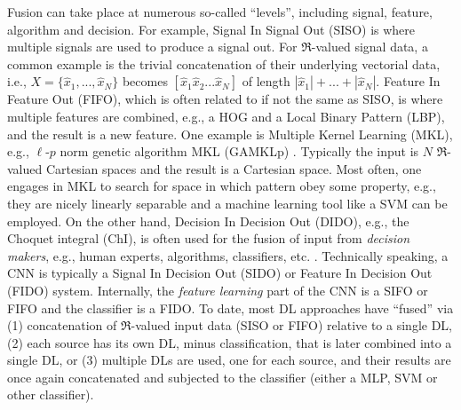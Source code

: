 \documentclass[12pt]{spieman}
\begin{document}
\begin{spacing}{1}
Fusion can take place at numerous so-called ``levels'', including signal, feature, algorithm and decision. For example, Signal In Signal Out (SISO) is where multiple signals are used to produce a signal out. For $\Re$-valued signal data, a common example is the trivial concatenation of their underlying vectorial data, i.e., $X=\{ \hat{x}_1, ... , \hat{x}_N \}$ becomes $[ \hat{x}_1 \hat{x}_2 ... \hat{x}_N ]$ of length $|\hat{x}_1|+...+|\hat{x}_N|$. Feature In Feature Out (FIFO), which is often related to if not the same as SISO, is where multiple features are combined, e.g., a HOG and a Local Binary Pattern (LBP), and the result is a new feature. One example is Multiple Kernel Learning (MKL), e.g., $\ell$-$p$ norm genetic algorithm MKL (GAMKLp) \cite{7762088} . Typically the input is $N$ $\Re$-valued Cartesian spaces and the result is a Cartesian space. Most often, one engages in MKL to search for space in which pattern obey some property, e.g., they are nicely linearly separable and a machine learning tool like a SVM can be employed. On the other hand, Decision In Decision Out (DIDO), e.g., the Choquet integral (ChI), is often used for the fusion of input from \emph{decision makers}, e.g., human experts, algorithms, classifiers, etc. \cite{6722924}. Technically speaking, a CNN is typically a Signal In Decision Out (SIDO) or Feature In Decision Out (FIDO) system. Internally, the \emph{feature learning} part of the CNN is a SIFO or FIFO and the classifier is a FIDO. To date, most DL approaches have ``fused'' via (1) concatenation of $\Re$-valued input data (SISO or FIFO) relative to a single DL, (2) each source has its own DL, minus classification, that is later combined into a single DL, or (3) multiple DLs are used, one for each source, and their results are once again concatenated and subjected to the classifier (either a MLP, SVM or other classifier). 


\end{spacing}
\end{document}

